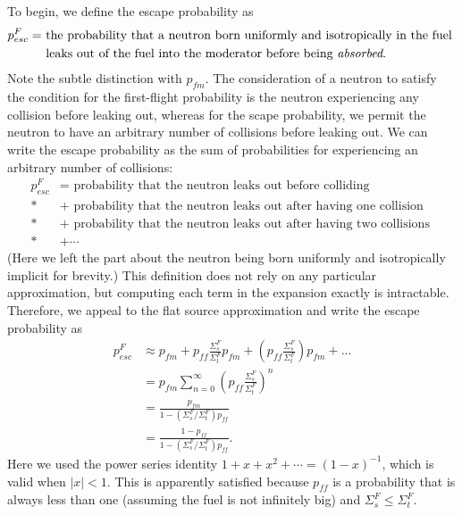To begin, we define the escape probability as
\begin{align}
   p_{esc}^F =  &\text{ the probability that a neutron born uniformly and isotropically in the fuel } \nonumber \\*
     			&\text{ leaks out of the fuel into the moderator before being \emph{absorbed}.} \nonumber
\end{align}
Note the subtle distinction with $p_{fm}$. The consideration of a neutron to satisfy the condition for the first-flight probability is the neutron experiencing any collision before leaking out, whereas for the scape probability, we permit the neutron to have an arbitrary number of collisions before leaking out. We can write the escape probability as the sum of probabilities for experiencing an arbitrary number of collisions:
\begin{align}
  p_{esc}^F &= \text{ probability that the neutron leaks out before colliding } \nonumber \\*
			&+ \text{ probability that the neutron leaks out after having one collision } \nonumber \\*
			&+ \text{ probability that the neutron leaks out after having two collisions } \nonumber \\*
			&+ \cdots \nonumber
\end{align}
(Here we left the part about the neutron being born uniformly and isotropically implicit for brevity.) This definition does not rely on any particular approximation, but computing each term in the expansion exactly is intractable. Therefore, we appeal to the flat source approximation and write the escape probability as
\begin{align}
  p_{esc}^F 
  &\approx p_{fm} + p_{ff} \frac{\Sigma_s^F}{\Sigma_t^F} p_{fm} + \left( p_{ff} \frac{\Sigma_s^F}{\Sigma_t^F} \right) p_{fm} + \ldots \nonumber \\
  &= p_{fm} \sum_{n = 0}^\infty \left( p_{ff} \frac{\Sigma_s^F}{\Sigma_t^F} \right)^n \nonumber \\
  &= \frac{ p_{fm} }{ 1 - ( \Sigma_s^F / \Sigma_t^F ) p_{ff} } \nonumber \\
  &= \frac{ 1 - p_{ff} }{ 1 - ( \Sigma_s^F / \Sigma_t^F ) p_{ff} } . \label{Eq:thermalization_escapeProbability_CollisionProbabilityMethod}
\end{align}
Here we used the power series identity $1 + x + x^2 + \cdots = ( 1 - x )^{-1}$, which is valid when $|x| < 1$. This is apparently satisfied because $p_{ff}$ is a probability that is always less than one (assuming the fuel is not infinitely big) and $\Sigma_s^F \le \Sigma_t^F$.

